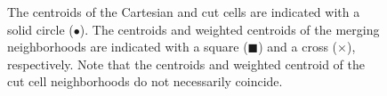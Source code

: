 \begin{itemize}
\end{itemize}

\begin{figure}[h]
    \centering
     \hfill
    \caption{\sf The centroids of the Cartesian and cut cells are indicated with a solid circle ($\bullet$).  The centroids and weighted centroids of the merging neighborhoods are indicated with a square ($\blacksquare$) and a cross ($\times$), respectively. Note that the centroids and weighted centroid of the cut cell neighborhoods do not necessarily coincide.}
    \label{fig:centroids}
\end{figure}



